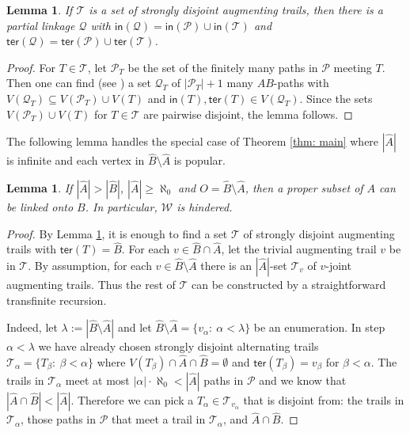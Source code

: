 \documentclass[12pt,a4paper]{amsart}
\theoremstyle{plain}
\newtheorem{lemma}[theorem]{Lemma}
\theoremstyle{definition}
\begin{document}
\begin{lemma}\label{lem: augmenting mass}
If $ \mathcal{T} $ is a set of strongly disjoint augmenting trails, then there is a partial linkage $ \mathcal{Q} $ with $ 
\mathsf{in}(\mathcal{Q})=\mathsf{in}(\mathcal{P}) \cup 
\mathsf{in}(\mathcal{T})$ and $ \mathsf{ter}(\mathcal{Q})=\mathsf{ter}(\mathcal{P}) \cup \mathsf{ter}(\mathcal{T})$.
\end{lemma}
\begin{proof}
For $ T\in \mathcal{T} $, let $ \mathcal{P}_T $ be the set of the finitely many paths in $ \mathcal{P} $ meeting $ T $. 
Then one can 
find (see \cite[Lemma 3.3.2]{diestel2017graph}) a set $ \mathcal{Q}_T $ of $ \left|\mathcal{P}_T\right|+1 $ many $ AB 
$-paths with $  V(\mathcal{Q}_T)\subseteq V(\mathcal{P}_T)\cup 
V(T) $ and $ \mathsf{in}(T), \mathsf{ter}(T)\in V(\mathcal{Q}_T) $. Since the sets $ V(\mathcal{P}_T)\cup 
V(T)  $ for $ T\in \mathcal{T} $ are pairwise disjoint, the lemma follows.
\end{proof}

The following lemma handles the special case of Theorem \ref{thm: main} where $\left|\widehat{A}\right| $ is infinite and each vertex in 
$\widehat{B}\setminus 
\widehat{A}$ is popular.
\begin{lemma}\label{lem: everybody popular}
If  $ \left|\widehat{A}\right|> \left|\widehat{B}\right|$, $ \left|\widehat{A}\right|\geq \aleph_0 $ and $ 
O=\widehat{B}\setminus \widehat{A}$, then a proper subset of $ A $ can be linked onto $ B $. In particular, $ \mathcal{W} 
$ is hindered. 
\end{lemma}
\begin{proof}
 By Lemma \ref{lem: augmenting mass}, it is enough to find a set $ 
\mathcal{T} $ of strongly disjoint 
augmenting trails with $ \mathsf{ter}(T)=\widehat{B} $. For each $v\in  \widehat{B}\cap \widehat{A} $, let the
trivial augmenting trail $ v $ be in $ \mathcal{T} $. By assumption, for each 
$ v \in \widehat{B}\setminus \widehat{A} $ there is an $ \left|\widehat{A}\right| $-set $ \mathcal{T}_v $ of $ v $-joint 
augmenting trails.  Thus the rest of  $ 
\mathcal{T} $ can be constructed by a straightforward transfinite recursion. 

Indeed, let $ \lambda:=\left|\widehat{B}\setminus 
\widehat{A}\right| $ and let $ \widehat{B}\setminus 
\widehat{A}=\{ v_\alpha:\ \alpha<\lambda \} $ be an enumeration. In step $ \alpha<\lambda $ we have already chosen 
strongly 
disjoint alternating trails $ \mathcal{T}_\alpha=\{ T_\beta:\ \beta<\alpha \} $ where   $ 
V(T_\beta)\cap \widehat{A}\cap \widehat{B}=\emptyset  $ and $ \mathsf{ter}(T_\beta)=v_\beta $ for $ \beta<\alpha $. The 
trails in $ 
\mathcal{T}_\alpha $ meet at most 
$ \left|\alpha\right| \cdot \aleph_0<\left|\widehat{A}\right| $ paths in $ \mathcal{P} $ and we know that $ \left|\widehat{A}\cap 
\widehat{B}\right|<\left|\widehat{A}\right| $.  Therefore we can pick a $ T_\alpha \in \mathcal{T}_{v_\alpha} $  that is 
disjoint from: the trails in $ 
\mathcal{T}_\alpha $, those paths in $ \mathcal{P} $ that meet a trail in $ \mathcal{T}_\alpha $, and  $ \widehat{A}\cap 
\widehat{B} $.
\end{proof}
\end{document}
